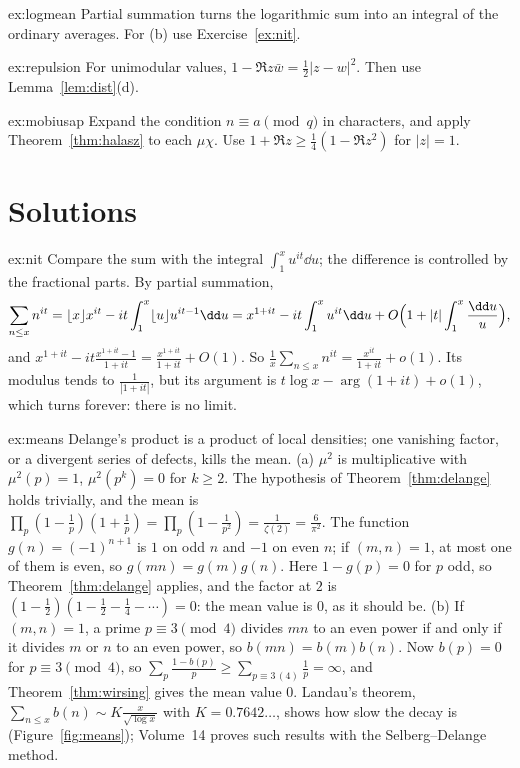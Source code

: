 \begin{hint}{ex:logmean}
Partial summation turns the logarithmic sum into an integral of the ordinary averages. For (b) use Exercise~\ref{ex:nit}.
\end{hint}

\begin{hint}{ex:repulsion}
For unimodular values, $1-\Re z\bar w=\frac12|z-w|^2$. Then use Lemma~\ref{lem:dist}(d).
\end{hint}

\begin{hint}{ex:mobiusap}
Expand the condition $n\equiv a\pmod q$ in characters, and apply Theorem~\ref{thm:halasz} to each $\mu\chi$. Use $1+\Re z\ge\frac14(1-\Re z^2)$ for $|z|=1$.
\end{hint}

\section{Solutions}

\begin{solution}{ex:nit}
\idea Compare the sum with the integral $\int_1^xu^{it}\dd u$; the difference is controlled by the fractional parts.
\writeup By partial summation,
\[
\sum_{n\le x}n^{it}=\lfloor x\rfloor x^{it}-it\int_1^x\lfloor u\rfloor u^{it-1}\dd u=x^{1+it}-it\int_1^xu^{it}\dd u+O\Bigl(1+|t|\int_1^x\frac{\dd u}u\Bigr),
\]
and $x^{1+it}-it\frac{x^{1+it}-1}{1+it}=\frac{x^{1+it}}{1+it}+O(1)$. So $\frac1x\sum_{n\le x}n^{it}=\frac{x^{it}}{1+it}+o(1)$. Its modulus tends to $\frac1{|1+it|}$, but its argument is $t\log x-\arg(1+it)+o(1)$, which turns forever: there is no limit.
\end{solution}

\begin{solution}{ex:means}
\idea Delange's product is a product of local densities; one vanishing factor, or a divergent series of defects, kills the mean.
\writeup (a) $\mu^2$ is multiplicative with $\mu^2(p)=1$, $\mu^2(p^k)=0$ for $k\ge2$. The hypothesis of Theorem~\ref{thm:delange} holds trivially, and the mean is $\prod_p(1-\frac1p)(1+\frac1p)=\prod_p(1-\frac1{p^2})=\frac1{\zeta(2)}=\frac6{\pi^2}$. The function $g(n)=(-1)^{n+1}$ is $1$ on odd $n$ and $-1$ on even $n$; if $(m,n)=1$, at most one of them is even, so $g(mn)=g(m)g(n)$. Here $1-g(p)=0$ for $p$ odd, so Theorem~\ref{thm:delange} applies, and the factor at $2$ is $(1-\frac12)(1-\frac12-\frac14-\cdots)=0$: the mean value is $0$, as it should be.
(b) If $(m,n)=1$, a prime $p\equiv3\pmod4$ divides $mn$ to an even power if and only if it divides $m$ or $n$ to an even power, so $b(mn)=b(m)b(n)$. Now $b(p)=0$ for $p\equiv3\pmod4$, so $\sum_p\frac{1-b(p)}p\ge\sum_{p\equiv3\,(4)}\frac1p=\infty$, and Theorem~\ref{thm:wirsing} gives the mean value $0$. Landau's theorem, $\sum_{n\le x}b(n)\sim K\frac x{\sqrt{\log x}}$ with $K=0.7642\ldots$, shows how slow the decay is (Figure~\ref{fig:means}); Volume~14 proves such results with the Selberg--Delange method.
\end{solution}

